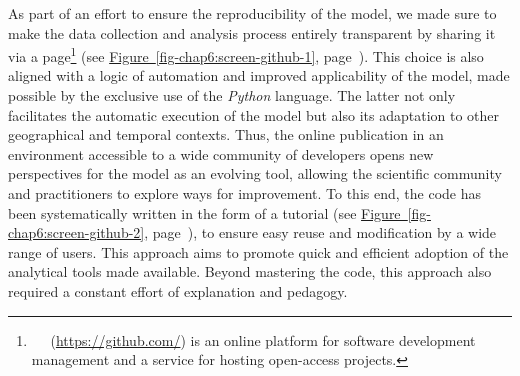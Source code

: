\begin{refsegment}
As part of an effort to ensure the reproducibility of the model, we made sure to make the data collection and analysis process entirely transparent by sharing it via a  page\footnote{~
    ~(\url{https://github.com/}) is an online platform for software development management and a service for hosting open-access projects.
} (see \hyperref[fig-chap6:screen-github-1]{Figure~\ref{fig-chap6:screen-github-1}}, page~\pageref{fig-chap6:screen-github-1}). This choice is also aligned with a logic of automation and improved applicability of the model, made possible by the exclusive use of the \textsl{Python} language. The latter not only facilitates the automatic execution of the model but also its adaptation to other geographical and temporal contexts. Thus, the online publication in an environment accessible to a wide community of developers opens new perspectives for the model as an evolving tool, allowing the scientific community and practitioners to explore ways for improvement. To this end, the code has been systematically written in the form of a tutorial (see \hyperref[fig-chap6:screen-github-2]{Figure~\ref{fig-chap6:screen-github-2}}, page~\pageref{fig-chap6:screen-github-2}), to ensure easy reuse and modification by a wide range of users. This approach aims to promote quick and efficient adoption of the analytical tools made available. Beyond mastering the code, this approach also required a constant effort of explanation and pedagogy.%

\bigskip
\begin{tcolorbox}[colback=white!5!white,
                  colframe=blue!75!blue,
                  title=
                  \bigskip
                  \center{GitHub Repository of the \textsl{Node Place Accessibility Ridership per Time} Model}
                  \bigskip]
\end{tcolorbox}
\bigskip


\end{refsegment}
